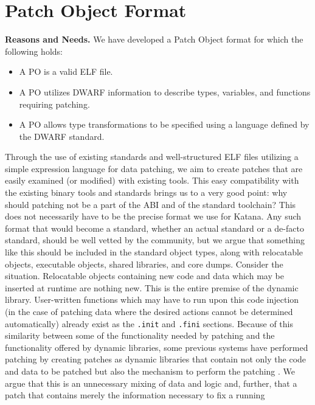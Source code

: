 \section{Patch Object Format}
\label{sec:poformat}
{\bf Reasons and Needs.}
We have developed a Patch Object format for which the following holds:
\begin{itemize}
 \item A PO is a valid ELF file.
 \item A PO utilizes DWARF information to describe types, variables, and functions requiring patching.
 \item A PO allows type transformations to be specified using a language defined by the DWARF standard.
\end{itemize}
Through the use of existing standards and well-structured ELF files
utilizing a simple expression language for data patching, we aim to
create patches that are easily examined (or modified) with existing
tools. This easy compatibility with the existing binary tools and
standards brings us to a very good point: why should patching not be a
part of the ABI and of the standard toolchain? This does not
necessarily have to be the precise format we use for Katana. Any such
format that would become a standard, whether an actual standard or a
de-facto standard, should be well vetted by the community, but we argue
that something like this should be included in the standard object
types, along with relocatable objects, executable objects, shared
libraries, and core dumps. Consider the situation. Relocatable objects
containing new code and data which may be inserted at runtime are
nothing new. This is the entire premise of the dynamic
library. User-written functions which may have to run upon this code
injection (in the case of patching data where the desired actions
cannot be determined automatically) already exist as the
\texttt{.init} and \texttt{.fini} sections. Because of this similarity
between some of the functionality needed by patching and the
functionality offered by dynamic
libraries, some previous systems have performed patching by creating
patches as dynamic libraries that contain not only the code and data
to be patched but also the mechanism to perform the patching \cite{ginseng}
\cite{polus}. We argue that
this is an unnecessary mixing of data and logic and, further, that a patch
that contains merely the information necessary to fix a running
